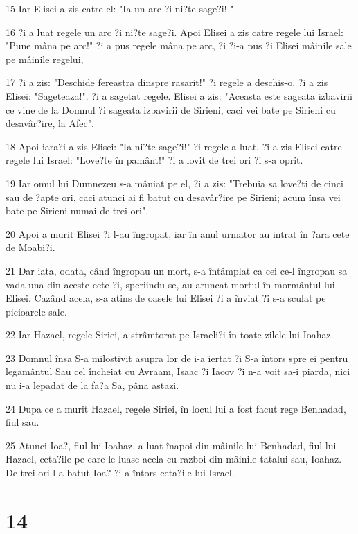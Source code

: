 \par 15 Iar Elisei a zis catre el: "Ia un arc ?i ni?te sage?i! "
\par 16 ?i a luat regele un arc ?i ni?te sage?i. Apoi Elisei a zis catre regele lui Israel: "Pune mâna pe arc!" ?i a pus regele mâna pe arc, ?i ?i-a pus ?i Elisei mâinile sale pe mâinile regelui,
\par 17 ?i a zis: "Deschide fereastra dinspre rasarit!" ?i regele a deschis-o. ?i a zis Elisei: "Sageteaza!". ?i a sagetat regele. Elisei a zis: "Aceasta este sageata izbavirii ce vine de la Domnul ?i sageata izbavirii de Sirieni, caci vei bate pe Sirieni cu desavâr?ire, la Afec".
\par 18 Apoi iara?i a zis Elisei: "Ia ni?te sage?i!" ?i regele a luat. ?i a zis Elisei catre regele lui Israel: "Love?te în pamânt!" ?i a lovit de trei ori ?i s-a oprit.
\par 19 Iar omul lui Dumnezeu s-a mâniat pe el, ?i a zis: "Trebuia sa love?ti de cinci sau de ?apte ori, caci atunci ai fi batut cu desavâr?ire pe Sirieni; acum însa vei bate pe Sirieni numai de trei ori".
\par 20 Apoi a murit Elisei ?i l-au îngropat, iar în anul urmator au intrat în ?ara cete de Moabi?i.
\par 21 Dar iata, odata, când îngropau un mort, s-a întâmplat ca cei ce-l îngropau sa vada una din aceste cete ?i, speriindu-se, au aruncat mortul în mormântul lui Elisei. Cazând acela, s-a atins de oasele lui Elisei ?i a înviat ?i s-a sculat pe picioarele sale.
\par 22 Iar Hazael, regele Siriei, a strâmtorat pe Israeli?i în toate zilele lui Ioahaz.
\par 23 Domnul însa S-a milostivit asupra lor de i-a iertat ?i S-a întors spre ei pentru legamântul Sau cel încheiat cu Avraam, Isaac ?i Iacov ?i n-a voit sa-i piarda, nici nu i-a lepadat de la fa?a Sa, pâna astazi.
\par 24 Dupa ce a murit Hazael, regele Siriei, în locul lui a fost facut rege Benhadad, fiul sau.
\par 25 Atunci Ioa?, fiul lui Ioahaz, a luat înapoi din mâinile lui Benhadad, fiul lui Hazael, ceta?ile pe care le luase acela cu razboi din mâinile tatalui sau, Ioahaz. De trei ori l-a batut Ioa? ?i a întors ceta?ile lui Israel.

\chapter{14}

